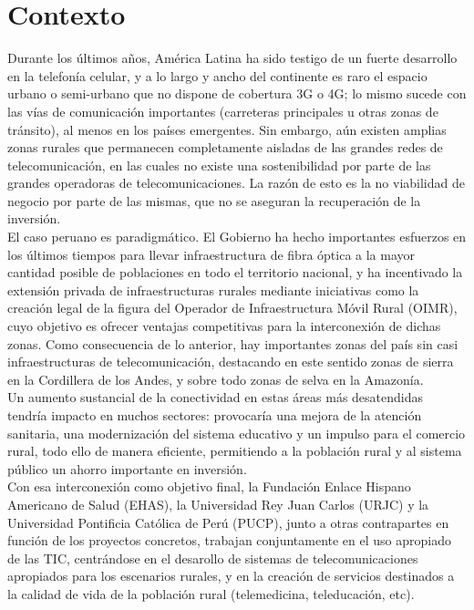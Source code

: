 \section{Contexto}
Durante los últimos años, América Latina ha sido testigo de un fuerte desarrollo en la telefonía celular, y a lo largo y ancho del continente es raro el espacio urbano o semi-urbano que no dispone de cobertura 3G o 4G; lo mismo sucede con las vías de comunicación importantes (carreteras principales u otras zonas de tránsito), al menos en los países emergentes. Sin embargo, aún existen amplias zonas rurales que permanecen completamente aisladas de las grandes redes de telecomunicación, en las cuales no existe una sostenibilidad por parte de las grandes operadoras de telecomunicaciones. La razón de esto es la no viabilidad de negocio por parte de las mismas, que no se aseguran la recuperación de la inversión. \\

El caso peruano es paradigmático. El Gobierno ha hecho importantes esfuerzos en los últimos tiempos para llevar infraestructura de fibra óptica a la mayor cantidad posible de poblaciones en todo el territorio nacional, y ha incentivado la extensión privada de infraestructuras rurales mediante iniciativas como la creación legal de la figura del Operador de Infraestructura Móvil Rural (OIMR), cuyo objetivo es ofrecer ventajas competitivas para la interconexión de dichas zonas. Como consecuencia de lo anterior, hay importantes zonas del país sin casi infraestructuras de telecomunicación, destacando en este sentido zonas de sierra en la Cordillera de los Andes, y sobre todo zonas de selva en la Amazonía.\\

Un aumento sustancial de la conectividad en estas áreas más desatendidas tendría impacto en muchos sectores: provocaría una mejora de la atención sanitaria, una modernización del sistema educativo y un impulso para el comercio rural, todo ello de manera eficiente, permitiendo a la población rural y al sistema público un ahorro importante en inversión.\\
	
Con esa interconexión como objetivo final, la Fundación Enlace Hispano Americano de Salud (EHAS), la Universidad Rey Juan Carlos (URJC) y la Universidad Pontificia Católica de Perú (PUCP), junto a otras contrapartes en función de los proyectos concretos, trabajan conjuntamente en el uso apropiado de las TIC, centrándose en el desarollo de sistemas de telecomunicaciones apropiados para los escenarios rurales, y en la creación de servicios destinados a la calidad de vida de la población rural (telemedicina, teleducación, etc).\\
	
